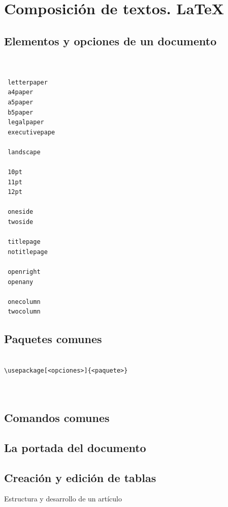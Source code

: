 \documentclass[a4paper, 10pt, titlepage]{report}
\begin{document}
\chapter{Composición de textos. LaTeX}
\section{Elementos y opciones de un documento}

 \begin{verbatim}   


 letterpaper
 a4paper
 a5paper
 b5paper
 legalpaper
 executivepape

 landscape

 10pt
 11pt
 12pt

 oneside
 twoside

 titlepage
 notitlepage

 openright
 openany
 
 onecolumn
 twocolumn
\end{verbatim}   

\newpage

\section{Paquetes comunes}

\begin{verbatim}

\usepackage[<opciones>]{<paquete>}



\end{verbatim}

\newpage

\section{Comandos comunes}

\newpage

\section{La portada del documento}

\newpage

\section{Creación y edición de tablas}

\newpage

\begin{section}{Estructura y desarrollo de un artículo}\end{section}
\end{document}
